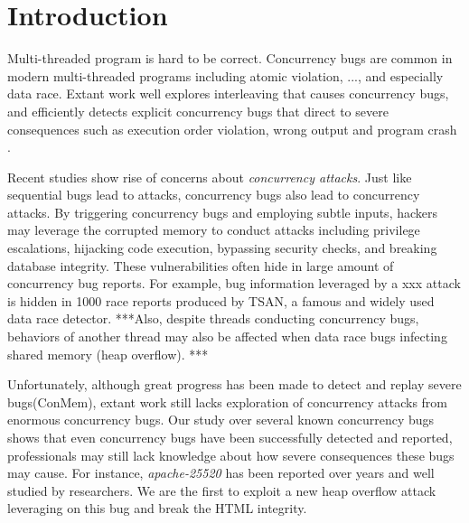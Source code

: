 \section{Introduction} \label{sec:intro}


Multi-threaded program is hard to be correct. 
Concurrency bugs are common in modern multi-threaded programs  
including atomic violation, ..., and especially data race\cite{lu:concurrency-bugs,conmem:asplos10,conseq:asplos11, lu:muvi:sosp}.
Extant work well explores interleaving that causes concurrency bugs, 
and efficiently detects explicit concurrency bugs that direct to  
severe consequences such as execution order violation, wrong output and program crash
\cite{wu2015:collaborative,tsan,valgrind:pldi,lu:muvi:sosp,conseq:asplos11,conmem:asplos10}.

Recent studies\cite{acidrain:sigmod17,con:hotpar12} show rise of concerns about \emph{concurrency attacks}.
Just like sequential bugs lead to attacks, concurrency bugs also lead to concurrency attacks. 
By triggering concurrency bugs and employing subtle inputs, 
hackers may leverage the corrupted memory to conduct  
attacks including privilege escalations\cite{uselib-bug-12791,mysql-bug-14747}, hijacking code execution\cite{berend-jan-wever-msiexploit}, bypassing security checks\cite{xwindows,theotheriphone,theotheriphone-2011}, 
and breaking database integrity\cite{acidrain:sigmod17}.
These vulnerabilities often hide in large amount of concurrency bug reports. 
For example, bug information leveraged by a xxx attack is hidden in 1000 race reports 
produced by TSAN\cite{tsan}, a famous and widely used data race detector. 
***Also, despite threads conducting concurrency bugs, 
behaviors of another thread may also be affected when data race bugs infecting shared memory (\eg heap overflow)\cite{apache-bug-25520,cve:2017-7533}. ***


Unfortunately, although great progress has been made to detect and replay severe bugs(\eg ConMem\cite{conmem:asplos10}), 
extant work still lacks exploration of concurrency attacks from enormous concurrency bugs. Our study over several known concurrency 
bugs\cite{apache-bug-25520, apache-bug-46215} shows that even concurrency bugs have been successfully detected and reported, 
professionals may still lack knowledge about how severe consequences these bugs may cause. 
For instance, \emph{apache-25520}\cite{apache-bug-25520} has been 
reported over years and well studied by researchers\cite{lu:concurrency-bugs}.  
We are the first to exploit a new heap overflow attack leveraging on this bug and break the HTML integrity.  

